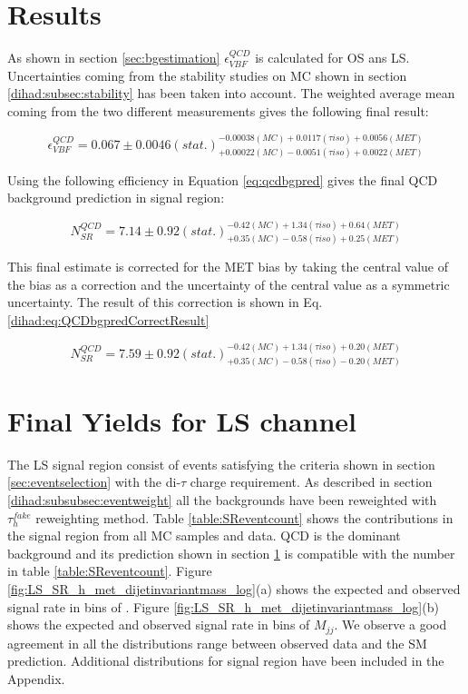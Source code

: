 \section{Results}
\label{section:results}

As shown in section \ref{sec:bgestimation} $\epsilon^{QCD}_{VBF}$ is calculated for OS ans LS. Uncertainties coming from the stability studies on MC shown in section \ref{dihad:subsec:stability} has been taken into account. The weighted average mean coming from the two different measurements gives the following final result:

\begin{equation}
\epsilon^{QCD}_{VBF} = 0.067\pm0.0046(stat.)^{-0.00038(MC)+0.0117(\tau iso)+0.0056(MET)}_{+0.00022(MC)-0.0051(\tau iso)+0.0022(MET)}
\label{eq:vbfefflsresult}
\end{equation}

Using the following efficiency in Equation \ref{eq:qcdbgpred} gives the final QCD background prediction in signal region:

\begin{equation}
N^{QCD}_{SR} = 7.14\pm0.92(stat.)^{-0.42(MC)+1.34(\tau iso)+0.64(MET)}_{+0.35(MC)-0.58(\tau iso)+0.25(MET)}
\label{eq:QCDbgpredresult}
\end{equation}

This final estimate is corrected for the MET bias by taking the central value of the  bias as a correction and 
the uncertainty of the central value as a symmetric uncertainty. The result of this correction is shown in Eq.
\ref{dihad:eq:QCDbgpredCorrectResult}

\begin{equation}
N^{QCD}_{SR} = 7.59\pm0.92(stat.)^{-0.42(MC)+1.34(\tau iso)+0.20(MET)}_{+0.35(MC)-0.58(\tau iso)-0.20(MET)}
\label{dihad:eq:QCDbgpredCorrectResult}
\end{equation}

\clearpage
\section{Final Yields for LS channel}

The LS signal region consist of events satisfying the criteria shown in section \ref{sec:eventselection} with the di-$\tau$ charge requirement. As described in section \ref{dihad:subsubsec:eventweight} all the backgrounds have been reweighted with $\tau_{h}^{fake}$ reweighting method. Table \ref{table:SReventcount} shows the contributions in the signal region from all MC samples and data.  QCD is the dominant background and its prediction shown in section \ref{section:results} is compatible with the number in table \ref{table:SReventcount}. Figure \ref{fig:LS_SR_h_met_dijetinvariantmass_log}(a) shows the expected and observed signal rate in bins of \met. Figure \ref{fig:LS_SR_h_met_dijetinvariantmass_log}(b) shows the expected and observed signal rate in bins of $M_{jj}$. We observe a good agreement in all the distributions range between observed data and the SM prediction. Additional distributions for signal region have been included in the Appendix.

